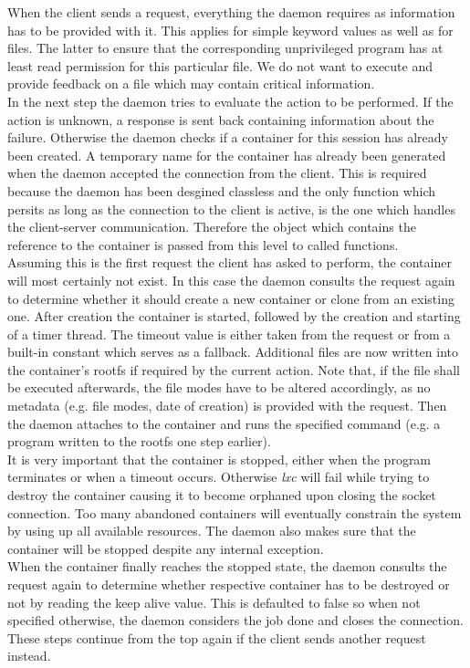 When the client sends a request, everything the daemon requires as information has to be provided with it.
This applies for simple keyword values as well as for files. The latter to ensure that
the corresponding unprivileged program has at least read permission for this particular file. We do
not want to execute and provide feedback on a file which may contain critical information.\\
In the next step the daemon tries to evaluate the action to be performed. If the action is unknown,
a response is sent back containing information about the failure. Otherwise the daemon checks if
a container for this session has already been created. A temporary name for the container has already
been generated when the daemon accepted the connection from the client. This is required because
the daemon has been desgined classless and the only function which persits as long as the connection
to the client is active, is the one which handles the client-server communication. Therefore
the object which contains the reference to the container is passed from this level to called functions.\\
Assuming this is the first
request the client has asked to perform, the container will most certainly not exist. In this case
the daemon consults the request again to determine whether it should create a new container or clone
from an existing one. After creation the container is started, followed by the creation and starting of
a timer thread. The timeout value is either taken from the request or from a built-in constant
which serves as a fallback.
Additional files are now written into the container's rootfs if required by the current action.
Note that, if the file shall be executed afterwards, the file modes have to be altered accordingly, as
no metadata (e.g. file modes, date of creation) is provided with the request.
Then the daemon attaches to the container and runs the specified command (e.g. a program written to
the rootfs one step earlier).\\
It is very important that the container is stopped, either when the program terminates or when a
timeout occurs. Otherwise \textit{lxc} will fail while trying to destroy the container causing it
to become orphaned upon closing the socket connection. Too many abandoned containers will eventually
constrain the system by using up all available resources. The daemon also makes sure that the container will be
stopped despite any internal exception.\\
When the container finally reaches the stopped state, the daemon consults the request again to determine whether
respective container has to be destroyed or not by reading the keep alive value. This is defaulted to false so when
not specified otherwise, the daemon considers the job done and closes the connection.
These steps continue from the top again if the client sends another request instead.

